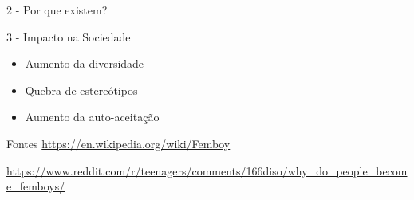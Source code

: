 \documentclass{beamer}
\begin{document}
\begin{frame}{2 - Por que existem?}
    
\end{frame}

\begin{frame}{3 - Impacto na Sociedade}
    \begin{itemize}
        \item Aumento da diversidade
        \item Quebra de estereótipos
        \item Aumento da auto-aceitação
    \end{itemize}
    
\end{frame}


\begin{frame}{Fontes}
    \url{https://en.wikipedia.org/wiki/Femboy}
    


    \url{https://www.reddit.com/r/teenagers/comments/166diso/why_do_people_become_femboys/}
\end{frame}
\end{document}
